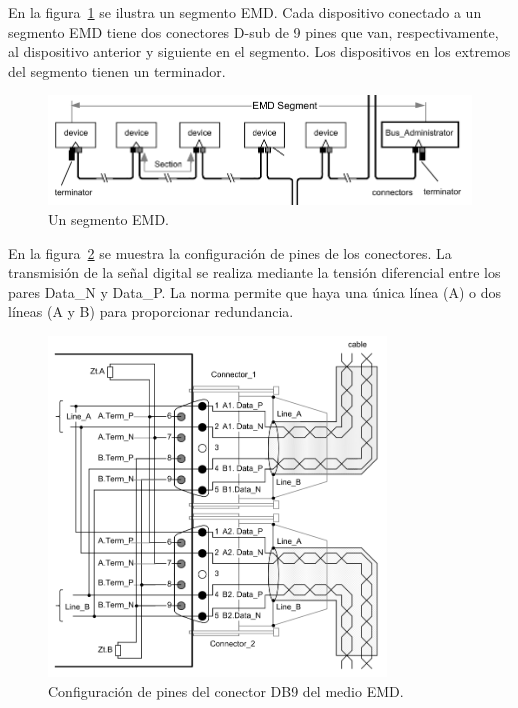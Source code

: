 En la figura~\ref{fig:segmento} se ilustra un segmento EMD.
Cada dispositivo conectado a un segmento EMD tiene dos conectores D-sub de 9 pines que van, respectivamente, al dispositivo anterior y siguiente en el segmento. Los dispositivos en los extremos del segmento tienen un terminador.

\begin{figure}[htbp]
	\centering
	\includegraphics[width=1\textwidth]{./Figures/segmento.png}
	\caption[Un segmento EMD]{Un segmento EMD.
        \\ }
    \label{fig:segmento}
\end{figure}

En la figura~\ref{fig:db9} se muestra la configuración de pines de los conectores.
La transmisión de la señal digital se realiza mediante la tensión diferencial entre los pares Data\_N y Data\_P. La norma permite que haya una única línea (A) o dos líneas (A y B) para proporcionar redundancia.

\begin{figure}[htbp]
	\centering
	\includegraphics[width=0.8\textwidth]{./Figures/db9-emd.png}
	\caption[Configuración de pines del conector DB9 del medio EMD]{Configuración de pines del conector DB9 del medio EMD.
        \\ }
    \label{fig:db9}
\end{figure}

